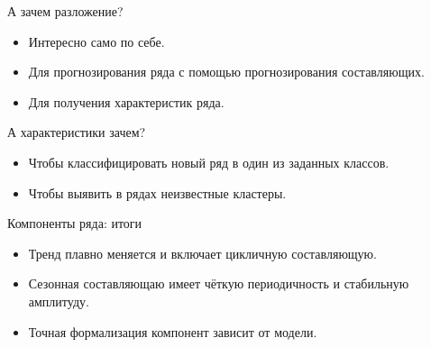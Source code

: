 \begin{frame}{А зачем разложение?}

  \begin{itemize}[<+->]
    \item Интересно \alert{само по себе}. 
    \item Для \alert{прогнозирования} ряда с помощью прогнозирования составляющих.
    \item Для получения \alert{характеристик ряда}. 
  \end{itemize}

  \pause
  А характеристики зачем?

  \begin{itemize}[<+->]
    \item Чтобы классифицировать новый ряд в один из заданных классов.
    \item Чтобы выявить в рядах неизвестные кластеры. 
  \end{itemize}
  
\end{frame}


\begin{frame}{Компоненты ряда: итоги}
  \begin{itemize}[<+->]
    \item Тренд \alert{плавно меняется} и включает цикличную составляющую.
    \item Сезонная составляющаю имеет \alert{чёткую периодичность} и \alert{стабильную амплитуду}.
    \item Точная формализация компонент \alert{зависит от модели}. 
  \end{itemize}

\end{frame}
